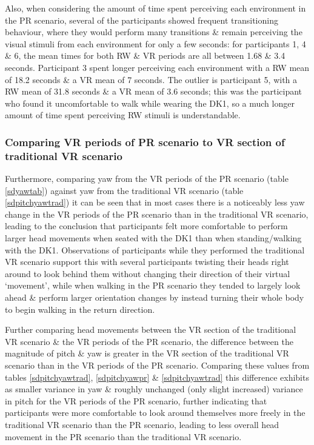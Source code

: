 Also, when considering the amount of time spent perceiving each environment in the PR scenario, several of the participants showed frequent transitioning behaviour, where they would perform many transitions \& remain perceiving the visual stimuli from each environment for only a few seconds: for participants 1, 4 \& 6, the mean times for both RW \& VR periods are all between 1.68 \& 3.4 seconds. Participant 3 spent longer perceiving each environment with a RW mean of 18.2 seconds \& a VR mean of 7 seconds. The outlier is participant 5, with a RW mean of 31.8 seconds \& a VR mean of 3.6 seconds; this was the participant who found it uncomfortable to walk while wearing the DK1, so a much longer amount of time spent perceiving RW stimuli is understandable.

\subsubsection{Comparing VR periods of PR scenario to VR section of traditional VR scenario}

Furthermore, comparing yaw from the VR periods of the PR scenario (table \ref{sdyawtab}) against yaw from the traditional VR scenario (table \ref{sdpitchyawtrad}) it can be seen that in most cases there is a noticeably less yaw change in the VR periods of the PR scenario than in the traditional VR scenario, leading to the conclusion that participants felt more comfortable to perform larger head movements when seated with the DK1 than when standing/walking with the DK1. Observations of participants while they performed the traditional VR scenario support this with several participants twisting their heads right around to look behind them without changing their direction of their virtual `movement', while when walking in the PR scenario they tended to largely look ahead \& perform larger orientation changes by instead turning their whole body to begin walking in the return direction.

Further comparing head movements between the VR section of the traditional VR scenario \& the VR periods of the PR scenario, the difference between the magnitude of pitch \& yaw is greater in the VR section of the traditional VR scenario than in the VR periods of the PR scenario. Comparing these values from tables \ref{sdpitchyawtrad}, \ref{sdpitchyawpr} \& \ref{sdpitchyawtrad} this difference exhibits as smaller variance in yaw \& roughly unchanged (only slight increased) variance in pitch for the VR periods of the PR scenario, further indicating that participants were more comfortable to look around themselves more freely in the traditional VR scenario than the PR scenario, leading to less overall head movement in the PR scenario than the traditional VR scenario.

